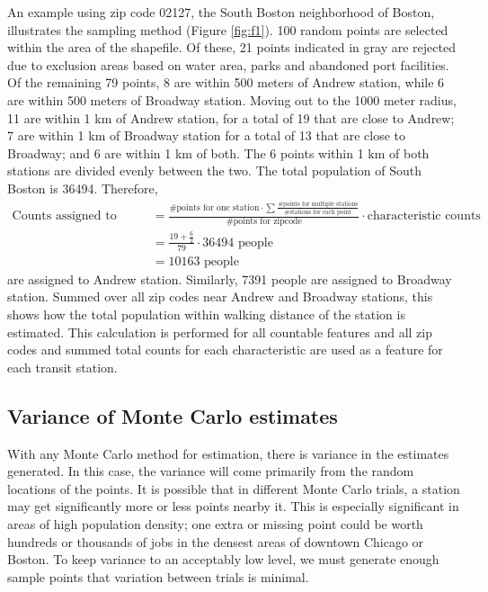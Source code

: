 \documentclass[11pt]{article}
\begin{document}
An example using zip code 02127, the South Boston neighborhood of Boston, illustrates the sampling method (Figure \ref{fig:f1}). 100 random points are selected within the area of the shapefile. Of these, 21 points indicated in gray are rejected due to exclusion areas based on water area, parks and abandoned port facilities. Of the remaining 79 points, 8 are within 500 meters of Andrew station, while 6 are within 500 meters of Broadway station. Moving out to the 1000 meter radius, 11 are within 1 km of Andrew station, for a total of 19 that are close to Andrew; 7 are within 1 km of Broadway station for a total of 13 that are close to Broadway; and 6 are within 1 km of both. The 6 points within 1 km of both stations are divided evenly between the two. The total population of South Boston is 36494. Therefore, 
\begin{align*}
\text{Counts assigned to station} &= \frac{\text{\# points for one station} \cdot \sum\frac{\text{\# points for multiple stations}}{\text{\# stations for each point}}}{\text{\# points for zipcode}}\cdot\text{characteristic counts}  \\
&= \frac{19 + \frac{6}{2}}{79}\cdot 36494 \text{ people} \\
&= 10163 \text{ people}
\end{align*}
are assigned to Andrew station. Similarly, 7391 people are assigned to Broadway station. Summed over all zip codes near Andrew and Broadway stations, this shows how the total population within walking distance of the station is estimated. This calculation is performed for all countable features and all zip codes and summed total counts for each characteristic are used as a feature for each transit station. 

\subsection{Variance of Monte Carlo estimates}

With any Monte Carlo method for estimation, there is variance in the estimates generated. In this case, the variance will come primarily from the random locations of the points. It is possible that in different Monte Carlo trials, a station may get significantly more or less points nearby it. This is especially significant in areas of high population density; one extra or missing point could be worth hundreds or thousands of jobs in the densest areas of downtown Chicago or Boston. To keep variance to an acceptably low level, we must generate enough sample points that variation between trials is minimal. 
\end{document}
